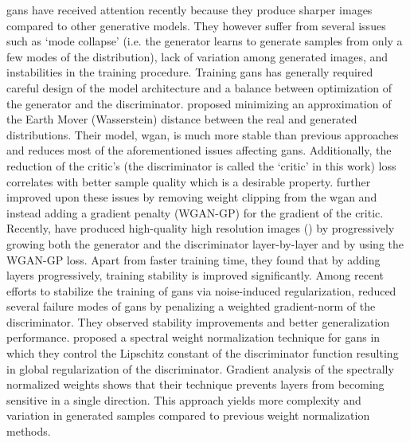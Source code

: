 \documentclass{article}
\begin{document}
\glspl{gan} have received attention recently because they produce sharper images \cite{NIPS2014_gan, NIPS2015_lapgan, ICLR2016_dcgan} compared to other generative models. They however suffer from several issues such as `mode collapse' (i.e. the generator learns to generate samples from only a few modes of the distribution), lack of variation among generated images, and instabilities in the training procedure. Training \glspl{gan} has generally required careful design of the model architecture and a balance between optimization of the generator and the discriminator. 
\citet{wgan} proposed minimizing an approximation of the Earth Mover (Wasserstein) distance between the real and generated distributions. Their model, \gls{wgan}, is much more stable than previous approaches and reduces most of the aforementioned issues affecting \glspl{gan}. Additionally, the reduction of the critic's (the discriminator is called the `critic' in this work) loss correlates with better sample quality which is a desirable property. \citet{wgan-gp} further improved upon these issues by removing weight clipping from the \gls{wgan} and instead adding a gradient penalty (WGAN-GP) for the gradient of the critic. Recently, \citet{karras2018progressive} have produced high-quality high resolution images () by progressively growing both the generator and the discriminator layer-by-layer and by using the WGAN-GP loss. Apart from faster training time, they found that by adding layers progressively, training stability is improved significantly. Among recent efforts to stabilize the training of \glspl{gan} via noise-induced regularization, \citet{NIPS2017_6797} reduced several failure modes of \glspl{gan} by penalizing a weighted gradient-norm of the discriminator. They observed stability improvements and better generalization performance. \citet{miyato2018spectral} proposed a spectral weight normalization technique for \glspl{gan} in which they control the Lipschitz constant of the discriminator function resulting in global regularization of the discriminator. Gradient analysis of the spectrally normalized weights shows that their technique prevents layers from becoming sensitive in a single direction. This approach yields more complexity and variation in generated samples compared to previous weight normalization methods.
\end{document}
